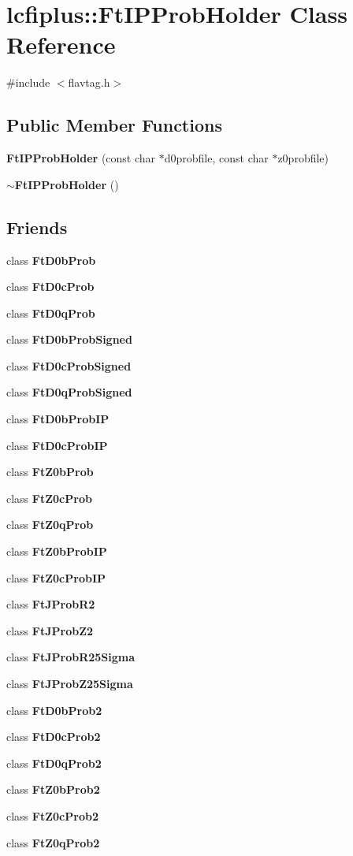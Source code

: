 \section{lcfiplus\+:\+:Ft\+I\+P\+Prob\+Holder Class Reference}
\label{classlcfiplus_1_1FtIPProbHolder}


{\ttfamily \#include $<$flavtag.\+h$>$}

\subsection*{Public Member Functions}
\begin{DoxyCompactItemize}
\item 
\textbf{ Ft\+I\+P\+Prob\+Holder} (const char $\ast$d0probfile, const char $\ast$z0probfile)
\item 
\textbf{ $\sim$\+Ft\+I\+P\+Prob\+Holder} ()
\end{DoxyCompactItemize}
\subsection*{Friends}
\begin{DoxyCompactItemize}
\item 
class \textbf{ Ft\+D0b\+Prob}
\item 
class \textbf{ Ft\+D0c\+Prob}
\item 
class \textbf{ Ft\+D0q\+Prob}
\item 
class \textbf{ Ft\+D0b\+Prob\+Signed}
\item 
class \textbf{ Ft\+D0c\+Prob\+Signed}
\item 
class \textbf{ Ft\+D0q\+Prob\+Signed}
\item 
class \textbf{ Ft\+D0b\+Prob\+IP}
\item 
class \textbf{ Ft\+D0c\+Prob\+IP}
\item 
class \textbf{ Ft\+Z0b\+Prob}
\item 
class \textbf{ Ft\+Z0c\+Prob}
\item 
class \textbf{ Ft\+Z0q\+Prob}
\item 
class \textbf{ Ft\+Z0b\+Prob\+IP}
\item 
class \textbf{ Ft\+Z0c\+Prob\+IP}
\item 
class \textbf{ Ft\+J\+Prob\+R2}
\item 
class \textbf{ Ft\+J\+Prob\+Z2}
\item 
class \textbf{ Ft\+J\+Prob\+R25\+Sigma}
\item 
class \textbf{ Ft\+J\+Prob\+Z25\+Sigma}
\item 
class \textbf{ Ft\+D0b\+Prob2}
\item 
class \textbf{ Ft\+D0c\+Prob2}
\item 
class \textbf{ Ft\+D0q\+Prob2}
\item 
class \textbf{ Ft\+Z0b\+Prob2}
\item 
class \textbf{ Ft\+Z0c\+Prob2}
\item 
class \textbf{ Ft\+Z0q\+Prob2}
\end{DoxyCompactItemize}


